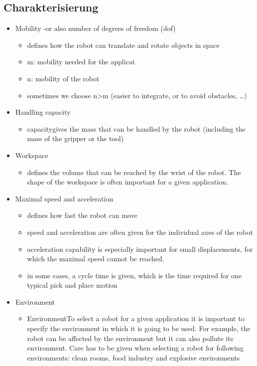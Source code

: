 \subsection{Charakterisierung}
\vspace{-0.5cm}
\begin{multicols}{2}
    \small
\begin{itemize}
    \item Mobility -or also number of degrees of freedom (dof)
    \begin{itemize}
        \item defines how the robot can translate and rotate objects in space
        \item m: mobility needed for the applicat
        \item n: mobility of the robot
        \item sometimes we choose n>m (easier to integrate, or to avoid obstacles, …)
    \end{itemize}
    \item Handling capacity
    \begin{itemize}
        \item capacitygives the mass that can be handled by the robot (including the mass of the gripper or the tool)
    \end{itemize}
    \item Workspace
    \begin{itemize}
        \item defines the volume that can be reached by the wrist of the robot. The shape of the workspace is often important for a given application.
    \end{itemize}
    \item Maximal speed and acceleration
    \begin{itemize}
        \item defines how fast the robot can move
        \item speed and acceleration are often given for the individual axes of the robot
        \item acceleration capability is especially important for small displacements, for which the maximal speed cannot be reached.
        \item in some cases, a cycle time is given, which is the time required for one typical pick and place motion
    \end{itemize}
    \item Environment
    \begin{itemize}
        \item EnvironmentTo select a robot for a given application it is important to specify the environment in which it is going to be used. For example, the robot can be affected by the environment but it can also pollute its environment. Care has to be given when selecting a robot for following environments: clean rooms, food industry and explosive environments

\end{itemize}
\end{itemize}
\end{multicols}
